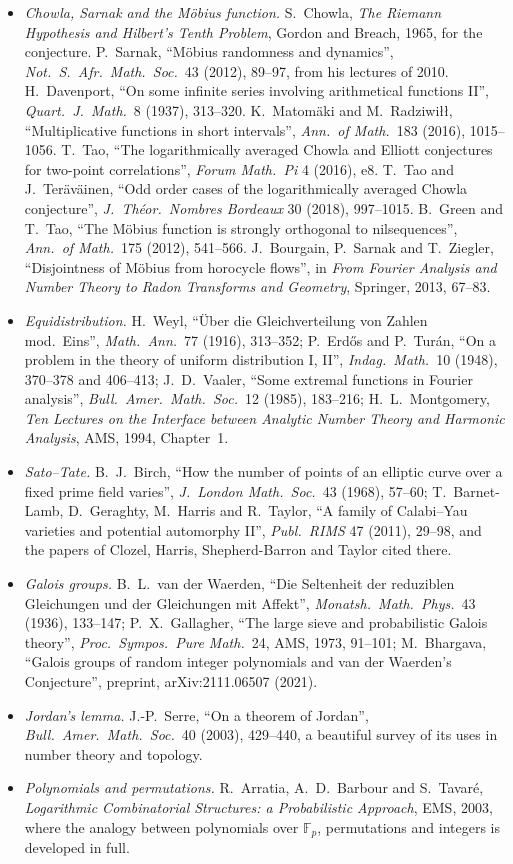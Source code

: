 \begin{itemize}
\item \emph{Chowla, Sarnak and the M\"obius function.} S.~Chowla, \emph{The Riemann Hypothesis and Hilbert's Tenth Problem}, Gordon and Breach, 1965, for the conjecture. P.~Sarnak, ``Möbius randomness and dynamics'', \emph{Not.\ S.\ Afr.\ Math.\ Soc.}\ 43 (2012), 89--97, from his lectures of 2010. H.~Davenport, ``On some infinite series involving arithmetical functions II'', \emph{Quart.\ J.\ Math.}\ 8 (1937), 313--320. K.~Matom\"aki and M.~Radziwi\l\l, ``Multiplicative functions in short intervals'', \emph{Ann.\ of Math.}\ 183 (2016), 1015--1056. T.~Tao, ``The logarithmically averaged Chowla and Elliott conjectures for two-point correlations'', \emph{Forum Math.\ Pi} 4 (2016), e8. T.~Tao and J.~Ter\"av\"ainen, ``Odd order cases of the logarithmically averaged Chowla conjecture'', \emph{J.\ Th\'eor.\ Nombres Bordeaux} 30 (2018), 997--1015. B.~Green and T.~Tao, ``The M\"obius function is strongly orthogonal to nilsequences'', \emph{Ann.\ of Math.}\ 175 (2012), 541--566. J.~Bourgain, P.~Sarnak and T.~Ziegler, ``Disjointness of Möbius from horocycle flows'', in \emph{From Fourier Analysis and Number Theory to Radon Transforms and Geometry}, Springer, 2013, 67--83.
\item \emph{Equidistribution.} H.~Weyl, ``Über die Gleichverteilung von Zahlen mod.\ Eins'', \emph{Math.\ Ann.}\ 77 (1916), 313--352; P.~Erd\H{o}s and P.~Turán, ``On a problem in the theory of uniform distribution I, II'', \emph{Indag.\ Math.}\ 10 (1948), 370--378 and 406--413; J.~D.~Vaaler, ``Some extremal functions in Fourier analysis'', \emph{Bull.\ Amer.\ Math.\ Soc.}\ 12 (1985), 183--216; H.~L.~Montgomery, \emph{Ten Lectures on the Interface between Analytic Number Theory and Harmonic Analysis}, AMS, 1994, Chapter~1.
\item \emph{Sato--Tate.} B.~J.~Birch, ``How the number of points of an elliptic curve over a fixed prime field varies'', \emph{J.\ London Math.\ Soc.}\ 43 (1968), 57--60; T.~Barnet-Lamb, D.~Geraghty, M.~Harris and R.~Taylor, ``A family of Calabi--Yau varieties and potential automorphy II'', \emph{Publ.\ RIMS} 47 (2011), 29--98, and the papers of Clozel, Harris, Shepherd-Barron and Taylor cited there.
\item \emph{Galois groups.} B.~L.~van der Waerden, ``Die Seltenheit der reduziblen Gleichungen und der Gleichungen mit Affekt'', \emph{Monatsh.\ Math.\ Phys.}\ 43 (1936), 133--147; P.~X.~Gallagher, ``The large sieve and probabilistic Galois theory'', \emph{Proc.\ Sympos.\ Pure Math.}\ 24, AMS, 1973, 91--101; M.~Bhargava, ``Galois groups of random integer polynomials and van der Waerden's Conjecture'', preprint, arXiv:2111.06507 (2021).
\item \emph{Jordan's lemma.} J.-P.~Serre, ``On a theorem of Jordan'', \emph{Bull.\ Amer.\ Math.\ Soc.}\ 40 (2003), 429--440, a beautiful survey of its uses in number theory and topology.
\item \emph{Polynomials and permutations.} R.~Arratia, A.~D.~Barbour and S.~Tavaré, \emph{Logarithmic Combinatorial Structures: a Probabilistic Approach}, EMS, 2003, where the analogy between polynomials over $\mathbb F_p$, permutations and integers is developed in full.
\end{itemize}
